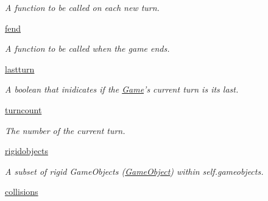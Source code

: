 \begin{DoxyCompactItemize}
\begin{DoxyCompactList}\small\item\em \-A function to be called on each new turn. \end{DoxyCompactList}\item 
\hypertarget{classGame_1_1Game_ad2b03faf4ed27993323f19a97d70ca4c}{\hyperlink{classGame_1_1Game_ad2b03faf4ed27993323f19a97d70ca4c}{fend}}\label{classGame_1_1Game_ad2b03faf4ed27993323f19a97d70ca4c}

\begin{DoxyCompactList}\small\item\em \-A function to be called when the game ends. \end{DoxyCompactList}\item 
\hypertarget{classGame_1_1Game_ac71449b283ea63a19f06872b38c2b655}{\hyperlink{classGame_1_1Game_ac71449b283ea63a19f06872b38c2b655}{lastturn}}\label{classGame_1_1Game_ac71449b283ea63a19f06872b38c2b655}

\begin{DoxyCompactList}\small\item\em \-A boolean that inidicates if the \hyperlink{classGame_1_1Game}{\-Game}'s current turn is its last. \end{DoxyCompactList}\item 
\hypertarget{classGame_1_1Game_abae9b3fda20fe7019193febded78b39d}{\hyperlink{classGame_1_1Game_abae9b3fda20fe7019193febded78b39d}{turncount}}\label{classGame_1_1Game_abae9b3fda20fe7019193febded78b39d}

\begin{DoxyCompactList}\small\item\em \-The number of the current turn. \end{DoxyCompactList}\item 
\hypertarget{classGame_1_1Game_a2aef6fc5c75fc51ee1106c9fad77883e}{\hyperlink{classGame_1_1Game_a2aef6fc5c75fc51ee1106c9fad77883e}{rigidobjects}}\label{classGame_1_1Game_a2aef6fc5c75fc51ee1106c9fad77883e}

\begin{DoxyCompactList}\small\item\em \-A subset of rigid \-Game\-Objects (\hyperlink{namespaceGameObject}{\-Game\-Object}) within self.\-gameobjects. \end{DoxyCompactList}\item 
\hypertarget{classGame_1_1Game_a8ccce12618221590a9732debd751e2d2}{\hyperlink{classGame_1_1Game_a8ccce12618221590a9732debd751e2d2}{collisions}}\label{classGame_1_1Game_a8ccce12618221590a9732debd751e2d2}


\end{DoxyCompactItemize}
